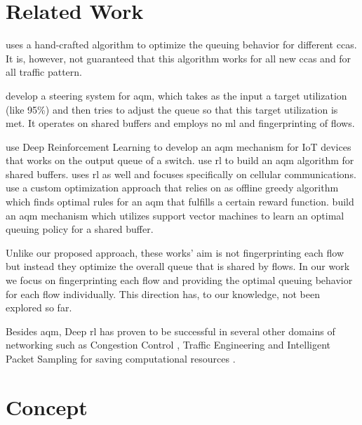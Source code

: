 \documentclass[conference]{IEEEtran}
\begin{document}
\section{Related Work}

\cite{bachl_cocoa_2019} uses a hand-crafted algorithm to optimize the queuing behavior for different \glspl{cca}. It is, however, not guaranteed that this algorithm works for all new \glspl{cca} and for all traffic pattern. 

\cite{bless_policy-oriented_2018} develop a steering system for \gls{aqm}, which takes as the input a target utilization (like 95\%) and then tries to adjust the queue so that this target utilization is met. It operates on shared buffers and employs no \gls{ml} and fingerprinting of flows. 

\cite{kim_deep_2019} use Deep Reinforcement Learning to develop an \gls{aqm} mechanism for IoT devices that works on the output queue of a switch.  \cite{bouacida_practical_2019,bisoy_design_2017} use \gls{rl} to build an \gls{aqm} algorithm for shared buffers. \cite{vucevic_reinforcement_2007} uses \gls{rl} as well and focuses specifically on cellular communications. \cite{lin_kemy_2015} use a custom optimization approach that relies on as offline greedy algorithm which finds optimal rules for an \gls{aqm} that fulfills a certain reward function. \cite{shah_sam_2016} build an \gls{aqm} mechanism which utilizes support vector machines to learn an optimal queuing policy for a shared buffer. 

Unlike our proposed approach, these works' aim is not fingerprinting each flow but instead they optimize the overall queue that is shared by flows. In our work we focus on fingerprinting each flow and providing the optimal queuing behavior for each flow individually. This direction has, to our knowledge, not been explored so far. 

Besides \gls{aqm}, Deep \gls{rl} has proven to be successful in several other domains of networking such as Congestion Control \cite{jay_deep_2019,bachl_rax_2019}, Traffic Engineering \cite{xu_experience-driven_2018} and Intelligent Packet Sampling for saving computational resources \cite{bachl_sparseids_2020}. 

\section{Concept}
\label{sec:concept}
\end{document}
